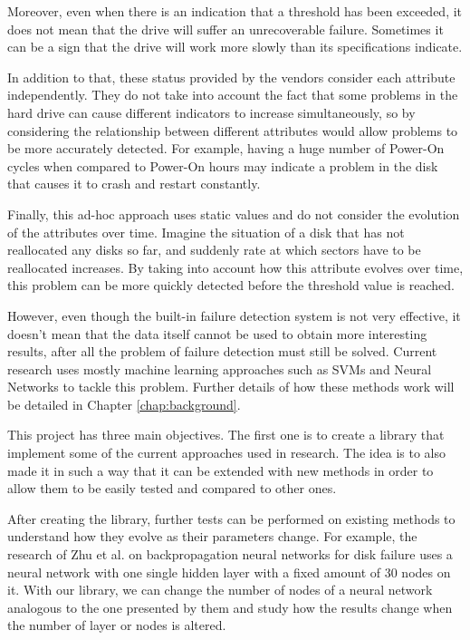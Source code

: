 Moreover, even when there is an indication that a threshold has been exceeded, it does not mean that the drive will suffer an unrecoverable failure.
Sometimes it can be a sign that the drive will work more slowly than its specifications indicate.

In addition to that, these status provided by the vendors consider each attribute independently.
They do not take into account the fact that some problems in the hard drive can cause different indicators to increase simultaneously, so by considering the relationship between different attributes would allow problems to be more accurately detected.
For example, having a huge number of Power-On cycles when compared to Power-On hours may indicate a problem in the disk that causes it to crash and restart constantly.

Finally, this ad-hoc approach uses static values and do not consider the evolution of the attributes over time.
Imagine the situation of a disk that has not reallocated any disks so far, and suddenly rate at which sectors have to be reallocated increases.
By taking into account how this attribute evolves over time, this problem can be more quickly detected before the threshold value is reached.

However, even though the built-in failure detection system is not very effective, it doesn't mean that the data itself cannot be used to obtain more interesting results, after all the problem of failure detection must still be solved.
Current research uses mostly machine learning approaches such as SVMs and Neural Networks to tackle this problem.
Further details of how these methods work will be detailed in Chapter \ref{chap:background}. 

This project has three main objectives.
The first one is to create a library that implement some of the current approaches used in research.
The idea is to also made it in such a way that it can be extended with new methods in order to allow them to be easily tested and compared to other ones. 

After creating the library, further tests can be performed on existing methods to understand how they evolve as their parameters change.
For example, the research of Zhu et al. on backpropagation neural networks for disk failure\cite{Zhu13} uses a neural network with one single hidden layer with a fixed amount of 30 nodes on it.
With our library, we can change the number of nodes of a neural network analogous to the one presented by them and study how the results change when the number of layer or nodes is altered.

